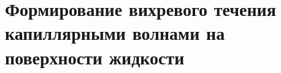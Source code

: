 


\chapter{Формирование вихревого течения капиллярными волнами на поверхности жидкости} \label{chapt3}


